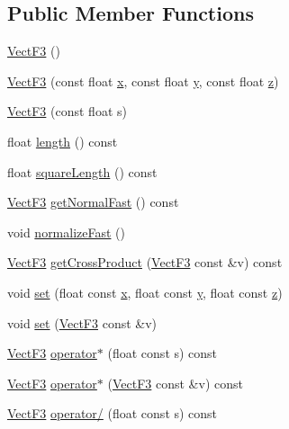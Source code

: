 \subsection*{Public Member Functions}
\begin{DoxyCompactItemize}
\item 
\hyperlink{classVectF3_a191c9d30e4a55e4431176ab2c40ee1fe}{Vect\-F3} ()
\item 
\hyperlink{classVectF3_a05186d7ee44cd4a8400218543376572f}{Vect\-F3} (const float \hyperlink{classVectF3_a1ec0a761f0461ca38f1ca57cf095f6fa}{x}, const float \hyperlink{classVectF3_a8331d1adee2ca04fdcd3f5fa4e133896}{y}, const float \hyperlink{classVectF3_a6ada1ce72aa27f56e4b529a28c0789c4}{z})
\item 
\hyperlink{classVectF3_a2a9f11ad40f722d57b62d3485279b2da}{Vect\-F3} (const float s)
\item 
float \hyperlink{classVectF3_aac7eefb77c7bafb1fa50b57be7557edb}{length} () const 
\item 
float \hyperlink{classVectF3_afdfea02aa84afa5c4cfbf96854c12c1c}{square\-Length} () const 
\item 
\hyperlink{classVectF3}{Vect\-F3} \hyperlink{classVectF3_a6af7e576967bc073f3a3d9ec19396c4b}{get\-Normal\-Fast} () const 
\item 
void \hyperlink{classVectF3_a24ac68c96a8d3eeabef0cdad6f651cd3}{normalize\-Fast} ()
\item 
\hyperlink{classVectF3}{Vect\-F3} \hyperlink{classVectF3_a27d481332ac479ce755588397d906d0c}{get\-Cross\-Product} (\hyperlink{classVectF3}{Vect\-F3} const \&v) const 
\item 
void \hyperlink{classVectF3_aaa9e69d486f62f2f9104fd76c2048954}{set} (float const \hyperlink{classVectF3_a1ec0a761f0461ca38f1ca57cf095f6fa}{x}, float const \hyperlink{classVectF3_a8331d1adee2ca04fdcd3f5fa4e133896}{y}, float const \hyperlink{classVectF3_a6ada1ce72aa27f56e4b529a28c0789c4}{z})
\item 
void \hyperlink{classVectF3_aaba2493a2373fed0af1b9a05db9cf81e}{set} (\hyperlink{classVectF3}{Vect\-F3} const \&v)
\item 
\hyperlink{classVectF3}{Vect\-F3} \hyperlink{classVectF3_a175e1794da184b80cf3193948291b308}{operator$\ast$} (float const s) const 
\item 
\hyperlink{classVectF3}{Vect\-F3} \hyperlink{classVectF3_afe1210be66728deacaba637c0b14c969}{operator$\ast$} (\hyperlink{classVectF3}{Vect\-F3} const \&v) const 
\item 
\hyperlink{classVectF3}{Vect\-F3} \hyperlink{classVectF3_a590877e276afb23e2473026753e0d826}{operator/} (float const s) const 

\end{DoxyCompactItemize}
